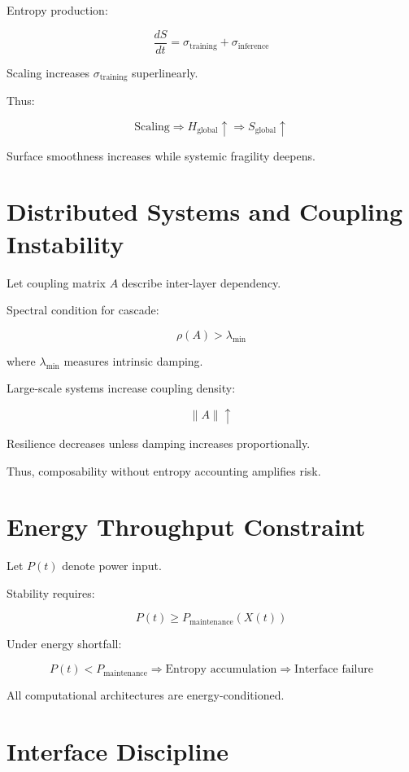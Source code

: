 \documentclass[11pt,openany]{book}
\begin{document}
Entropy production:

\[
\frac{dS}{dt} = \sigma_{\text{training}} + \sigma_{\text{inference}}
\]

Scaling increases $\sigma_{\text{training}}$ superlinearly.

Thus:

\[
\text{Scaling} \Rightarrow H_{\text{global}} \uparrow \Rightarrow S_{\text{global}} \uparrow
\]

Surface smoothness increases while systemic fragility deepens.

\section{Distributed Systems and Coupling Instability}

Let coupling matrix $A$ describe inter-layer dependency.

Spectral condition for cascade:

\[
\rho(A) > \lambda_{\text{min}}
\]

where $\lambda_{\text{min}}$ measures intrinsic damping.

Large-scale systems increase coupling density:

\[
\|A\| \uparrow
\]

Resilience decreases unless damping increases proportionally.

Thus, composability without entropy accounting amplifies risk.

\section{Energy Throughput Constraint}

Let $P(t)$ denote power input.

Stability requires:

\[
P(t) \geq P_{\text{maintenance}}(X(t))
\]

Under energy shortfall:

\[
P(t) < P_{\text{maintenance}}
\Rightarrow \text{Entropy accumulation}
\Rightarrow \text{Interface failure}
\]

All computational architectures are energy-conditioned.

\section{Interface Discipline}
\end{document}
